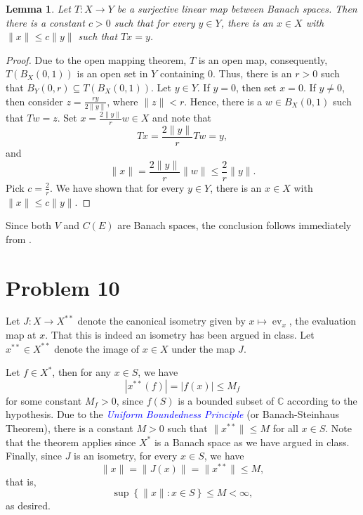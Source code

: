 \documentclass[10pt]{amsart}
\theoremstyle{thmstyle}
\newtheorem{lemma}[theorem]{Lemma}
\theoremstyle{defstyle}
\newcommand{\bbC}{\mathbb{C}}
\newcommand{\ev}{\operatorname{ev}}
\newcommand{\define}[1]{\textcolor{blue}{\textit{#1}}}
\renewcommand{\le}{\leqslant}
\begin{document}
\begin{lemma}
	Let $T: X\to Y$ be a surjective linear map between Banach spaces. Then there is a constant $c > 0$ such that for every $y\in Y$, there is an $x\in X$ with $\|x\|\le c\|y\|$ such that $Tx = y$.
\end{lemma}
\begin{proof}
	Due to the open mapping theorem, $T$ is an open map, consequently, $T\left(B_X(0, 1)\right)$ is an open set in $Y$ containing $0$. Thus, there is an $r > 0$ such that $B_Y(0, r)\subseteq T\left(B_X(0, 1)\right)$. Let $y\in Y$. If $y = 0$, then set $x = 0$. If $y\ne 0$, then consider $z = \frac{ry}{2\|y\|}$, where $\|z\| < r$. Hence, there is a $w\in B_X(0, 1)$ such that $Tw = z$. Set $x = \frac{2\|y\|}{r}w\in X$ and note that 
	\begin{equation*}
		Tx = \frac{2\|y\|}{r}Tw = y,
	\end{equation*}
	and 
	\begin{equation*}
		\|x\| = \frac{2\|y\|}{r}\|w\|\le \frac{2}{r}\|y\|.
	\end{equation*}
	Pick $c = \frac{2}{r}$. We have shown that for every $y\in Y$, there is an $x\in X$ with $\|x\|\le c\|y\|$.
\end{proof}

Since both $V$ and $C(E)$ are Banach spaces, the conclusion follows immediately from .

\section{Problem 10}
Let $J: X\to X^{\ast\ast}$ denote the canonical isometry given by $x\mapsto\ev_x$, the evaluation map at $x$. That this is indeed an isometry has been argued in class. Let $x^{\ast\ast}\in X^{\ast\ast}$ denote the image of $x\in X$ under the map $J$. 

Let $f\in X^\ast$, then for any $x\in S$, we have 
\begin{equation*}
	|x^{\ast\ast}(f)| = |f(x)|\le M_f
\end{equation*}
for some constant $M_f > 0$, since $f(S)$ is a bounded subset of $\bbC$ according to the hypothesis. Due to the \define{Uniform Boundedness Principle} (or Banach-Steinhaus Theorem), there is a constant $M > 0$ such that $\|x^{\ast\ast}\|\le M$ for all $x\in S$. Note that the theorem applies since $X^\ast$ is a Banach space as we have argued in class. Finally, since $J$ is an isometry, for every $x\in S$, we have 
\begin{equation*}
	\|x\| = \|J(x)\| = \|x^{\ast\ast}\|\le M,
\end{equation*}
that is, 
\begin{equation*}
	\sup\left\{\|x\|\colon x\in S\right\}\le M < \infty,
\end{equation*}
as desired.
\end{document}
